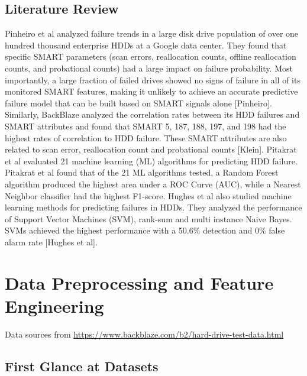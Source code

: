 \documentclass[12pt,a4paper,english]{amsart}
\begin{document}
\subsection{Literature Review}

Pinheiro et al analyzed failure trends in a large disk drive population of over one hundred thousand enterprise HDDs at a Google data center. They found that specific SMART parameters (scan errors, reallocation counts, offline reallocation counts, and probational counts) had a large impact on failure probability. Most importantly, a large fraction of failed drives showed no signs of failure in all of its monitored SMART features, making it unlikely to achieve an accurate predictive failure model that can be built based on SMART signals alone [Pinheiro]. Similarly, BackBlaze analyzed the correlation rates between its HDD failures and SMART attributes and found that SMART 5, 187, 188, 197, and 198 had the highest rates of correlation to HDD failure. These SMART attributes are also related to scan error, reallocation count and probational counts [Klein].
Pitakrat et al evaluated 21 machine learning (ML) algorithms for predicting HDD failure. Pitakrat et al found that of the 21 ML algorithms tested, a Random Forest algorithm produced the highest area under a ROC Curve (AUC), while a Nearest Neighbor classifier had the highest F1-score.
Hughes et al also studied machine learning methods for predicting failures in HDDs. They analyzed the performance of Support Vector Machines (SVM), rank-sum and multi instance Naive Bayes. SVMs achieved the highest performance with a 50.6\% detection and 0\% false alarm rate [Hughes et al].

%
\section{Data Preprocessing and Feature Engineering}

Data sources from \url{https://www.backblaze.com/b2/hard-drive-test-data.html}

\subsection{First Glance at Datasets}
\end{document}
